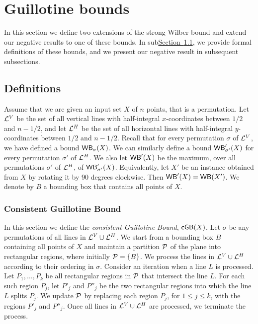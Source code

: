 \documentclass[11pt]{article}
\numberwithin{equation}{section}
\theoremstyle{definition}
\theoremstyle{plain}
\newcommand{\expref}[2]{\hyperref[#2]{#1~\ref{#2}}}
\begin{document}
%

%

%

%
%
%
%
\section{Guillotine bounds}\label{sec: extension to extended}
%
%
%
%

In this section we define two extensions of the strong Wilber bound and extend our negative results to  one of these bounds.
%
In sub\expref{Section}{subsec: defs}, we provide formal definitions of these bounds, and we present our negative result in subsequent subsections.  
 
\subsection{Definitions} 
\label{subsec: defs} 


Assume that we are given an input set $X$ of $n$ points, that is a permutation. Let ${\mathcal L}^V$ be the set of all vertical lines with half-integral $x$-coordinates between $1/2$ and $n-1/2$, and let ${\mathcal L}^H$ be the set of all horizontal lines with half-integral $y$-coordinates between $1/2$ and $n-1/2$. Recall that for every permutation $\sigma$ of ${\mathcal L}^V$, we have defined a bound $\mathsf{WB}_{\sigma}(X)$. We can similarly define a bound $\mathsf{WB}'_{\sigma'}(X)$ for every permutation $\sigma'$ of ${\mathcal L}^H$. We also let $\mathsf{WB}'(X)$ be the maximum, over all permutations $\sigma'$ of ${\mathcal L}^H$, of $\mathsf{WB}'_{\sigma'}(X)$. Equivalently, let $X'$ be an instance obtained from $X$ by rotating it by $90$ degrees clockwise. Then $\mathsf{WB}'(X)=\mathsf{WB}(X')$. We denote by $B$ a bounding box that contains all points of $X$.

\subsubsection{Consistent Guillotine Bound}


In this section we define the \emph{consistent Guillotine Bound}, $\mathsf{cGB}(X)$. Let $\sigma$ be any permutations of all lines in ${\mathcal L}^V\cup {\mathcal L}^H$. 
We start from a bounding box $B$ containing all points of $X$ and maintain a partition ${\mathcal P}$ of the plane into rectangular regions, where initially ${\mathcal P} = \left\{ B \right\}$.  
We process the lines in ${\mathcal L}^V \cup {\mathcal L}^H$ according to their ordering in $\sigma$. 
Consider an iteration when a line $L$ is processed. Let $P_1,\ldots, P_k$ be all rectangular regions in ${\mathcal P}$ that intersect the line $L$. For each such region $P_j$, let $P'_j$ and $P''_j$ be the two rectangular regions into which the line $L$ splits $P_j$. 
We update ${\mathcal P}$ by replacing each region $P_j$, for $1\leq j\leq k$, with the regions $P'_j$ and $P''_j$. 
Once all lines in ${\mathcal L}^V\cup {\mathcal L}^H$ are processed, we terminate the process.
\end{document}
